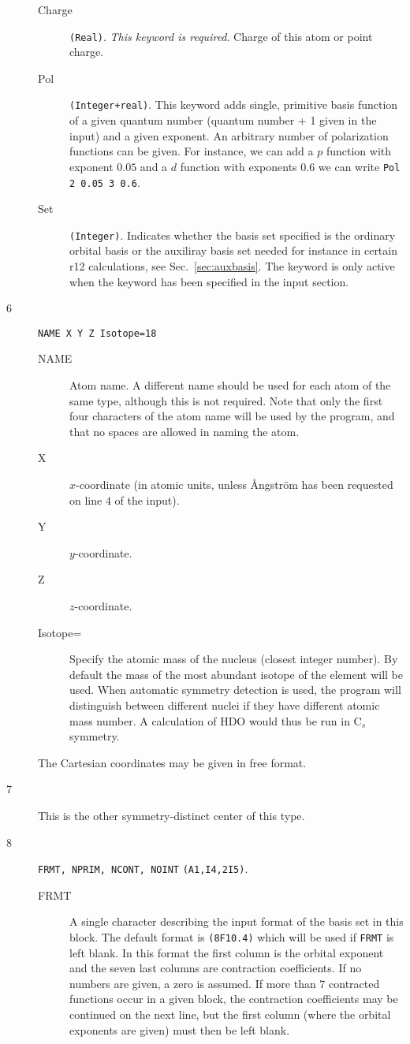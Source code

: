 \begin{description}
\begin{description}
\item[Charge] \verb|(Real)|. {\em This keyword is required\/}. Charge of this atom
  or point charge. 
\item[Pol] \verb|(Integer+real)|. This keyword adds single, primitive
  basis function of a given quantum number (quantum number + 1 given
  in the input) and a given exponent. An arbitrary number of
  polarization functions can be given. For instance, we can add a $p$
  function with exponent $0.05$ and a $d$ function with exponents
  $0.6$ we can write \verb|Pol 2 0.05 3 0.6|.
\item[Set] \verb|(Integer)|. Indicates whether the basis set specified
  is the ordinary orbital basis or the auxiliray basis set needed for
  instance in certain r12 calculations, see
  Sec.~\ref{sec:auxbasis}. The keyword is only active when the keyword
   has been specified in the   input section.
\end{description}
\item[6] \verb|NAME X Y Z Isotope=18|
\begin{description}
\item[NAME] Atom name.  A different name should be used for
each atom of the same type, although this is not required. Note that
only the first four characters of the atom name will be used by the
program, and that no spaces are allowed in naming the atom.
\item[X] $x$-coordinate (in atomic units, unless \AA ngstr\"{o}m
has been requested on line $4$ of the input).
\item[Y] $y$-coordinate.
\item[Z] $z$-coordinate.
\item[Isotope=] Specify the atomic mass of the nucleus (closest
  integer number). By default the mass of the most abundant isotope
  of the element will be used. When automatic symmetry detection is
  used, the program will distinguish between different nuclei if they
  have different atomic mass number. A calculation of HDO would thus
  be run in C$_s$ symmetry. 
\end{description}
The Cartesian coordinates may
be given in free format.
\item[7] This is the other symmetry-distinct center of this type.
\item[8] \verb|FRMT, NPRIM, NCONT, NOINT| {\tt (A1,I4,2I5)}.
\begin{description}
\item[FRMT] A single character describing the input format of the
basis set in this block. The default format is {\tt (8F10.4)} which
will be used if {\tt FRMT} is left blank. In this format
the first column is the orbital exponent and the seven last columns
are contraction coefficients. If no numbers are given, a zero is
assumed. If more than 7 contracted functions occur in a given block,
the contraction coefficients may be continued on the next line, but
the first column (where the orbital exponents are given) must then be
left blank.


\end{description}
\end{description}
